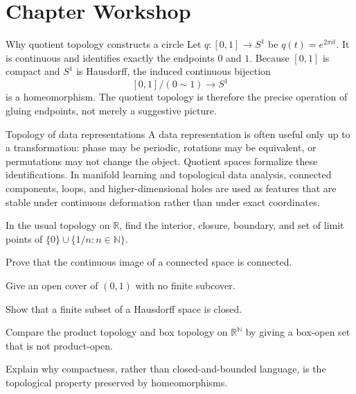 \section{Chapter Workshop}

\begin{workedexample}{Why quotient topology constructs a circle}
Let $q:[0,1]\to S^1$ be $q(t)=e^{2\pi it}$. It is continuous and identifies exactly the endpoints $0$ and $1$. Because $[0,1]$ is compact and $S^1$ is Hausdorff, the induced continuous bijection
\[
    [0,1]/(0\sim1)\longrightarrow S^1
\]
is a homeomorphism. The quotient topology is therefore the precise operation of gluing endpoints, not merely a suggestive picture.
\end{workedexample}

\begin{applicationbox}{Topology of data representations}
A data representation is often useful only up to a transformation: phase may be periodic, rotations may be equivalent, or permutations may not change the object. Quotient spaces formalize these identifications. In manifold learning and topological data analysis, connected components, loops, and higher-dimensional holes are used as features that are stable under continuous deformation rather than under exact coordinates.
\end{applicationbox}

\begin{chapterexercises}
    \item In the usual topology on $\mathbb{R}$, find the interior, closure, boundary, and set of limit points of $\{0\}\cup\{1/n:n\in\mathbb{N}\}$.
    \item Prove that the continuous image of a connected space is connected.
    \item Give an open cover of $(0,1)$ with no finite subcover.
    \item Show that a finite subset of a Hausdorff space is closed.
    \item Compare the product topology and box topology on $\mathbb{R}^{\mathbb{N}}$ by giving a box-open set that is not product-open.
    \item Explain why compactness, rather than closed-and-bounded language, is the topological property preserved by homeomorphisms.
\end{chapterexercises}

